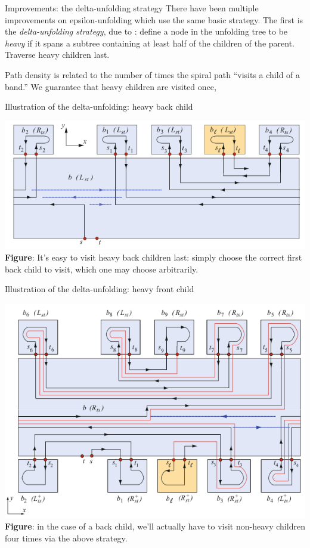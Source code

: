 \documentclass[handout]{beamer}
\theoremstyle{plain}
\begin{document}
  \begin{frame}{Improvements: the delta-unfolding strategy}
    There have been multiple improvements on epsilon-unfolding which use the same basic strategy.
    The first is the \emph{delta-unfolding strategy}, due to :
    define a node in the unfolding tree to be \emph{heavy} if it spans a subtree containing at least half of the children of the parent.
    Traverse heavy children last.
    
    \pause Path density is related to the number of times the spiral path ``visits a child of a band.''
    We guarantee that heavy children are visited once,
  \end{frame}

\begin{frame}{Illustration of the delta-unfolding: heavy back child}
  \begin{center}
    \includegraphics[width=\textwidth]{./figs/Delta_unfolding_back.png}\\
    \tiny \textbf{Figure}: It's easy to visit heavy back children last: simply choose the correct first back child to visit, which one may choose arbitrarily.
  \end{center}
\end{frame}

\begin{frame}{Illustration of the delta-unfolding: heavy front child}
  \begin{center}
    \includegraphics[width=.75\textwidth]{./figs/Delta_unfolding_front.png}\\
    \tiny \textbf{Figure}: in the case of a back child, we'll actually have to visit non-heavy children four times via the above strategy.
  \end{center}
\end{frame}
\end{document}
